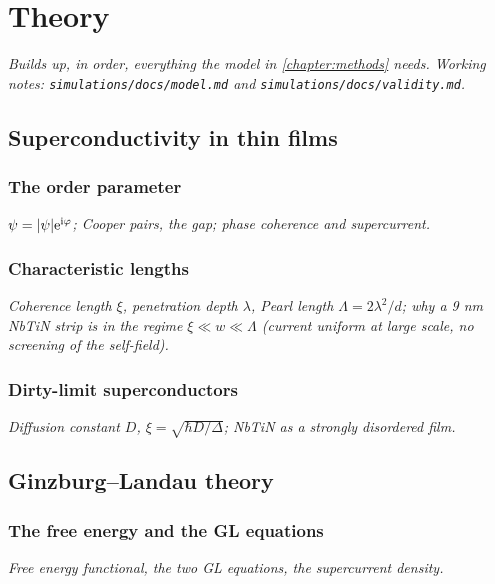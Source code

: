 \chapter{Theory}
\label{chapter:theory}

\emph{Builds up, in order, everything the model in \cref{chapter:methods} needs. Working notes:
\texttt{simulations/docs/model.md} and \texttt{simulations/docs/validity.md}.}

\section{Superconductivity in thin films}
\label{sec:th-films}

\subsection{The order parameter}
\label{sec:th-order-parameter}
\emph{$\psi = \lvert\psi\rvert\mathrm{e}^{\mathrm{i}\varphi}$; Cooper pairs, the gap; phase coherence and supercurrent.}

\subsection{Characteristic lengths}
\label{sec:th-lengths}
\emph{Coherence length $\xi$, penetration depth $\lambda$, Pearl length $\Lambda = 2\lambda^2/d$; why a 9 nm NbTiN
strip is in the regime $\xi \ll w \ll \Lambda$ (current uniform at large scale, no screening of the self-field).}

\subsection{Dirty-limit superconductors}
\label{sec:th-dirty}
\emph{Diffusion constant $D$, $\xi = \sqrt{\hbar D / \Delta}$; NbTiN as a strongly disordered film.}

\section{Ginzburg--Landau theory}
\label{sec:th-gl}

\subsection{The free energy and the GL equations}
\label{sec:th-gl-equations}
\emph{Free energy functional, the two GL equations, the supercurrent density.}

